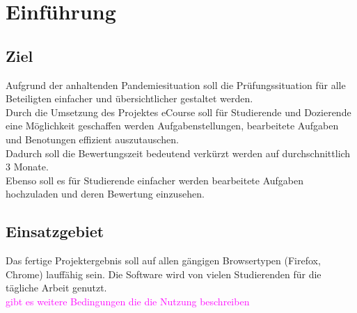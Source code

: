 
\chapter{Einführung}

\section{Ziel}
Aufgrund der anhaltenden Pandemiesituation soll die Prüfungssituation für alle Beteiligten einfacher und übersichtlicher gestaltet werden. \\
Durch die Umsetzung des Projektes eCourse soll für Studierende und Dozierende eine Möglichkeit geschaffen werden Aufgabenstellungen, bearbeitete Aufgaben und Benotungen effizient auszutauschen. \\
Dadurch soll die Bewertungszeit bedeutend verkürzt werden auf durchschnittlich 3 Monate. \\
Ebenso soll es für Studierende einfacher werden bearbeitete Aufgaben hochzuladen und deren Bewertung einzusehen. \\

\section{Einsatzgebiet}
Das fertige Projektergebnis soll auf allen gängigen Browsertypen (Firefox, Chrome) lauffähig sein. Die Software wird von vielen Studierenden für die tägliche Arbeit genutzt. \\
\textcolor{magenta}{gibt es weitere Bedingungen die die Nutzung beschreiben}

